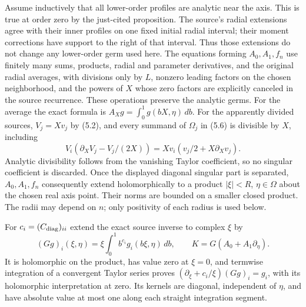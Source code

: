 Assume inductively that all lower-order profiles are analytic near
the axis. This is true at order zero by the just-cited proposition.
The source's radial extensions agree with their inner profiles on
one fixed initial radial interval; their moment corrections have
support to the right of that interval. Thus those extensions do not
change any lower-order germ used here. The equations forming
$A_0,A_1,f_n$ use finitely many sums, products, radial and parameter
derivatives, and the original radial averages, with divisions only
by $L$, nonzero leading factors on the chosen neighborhood, and
the powers of $X$ whose zero factors are explicitly canceled in
the source recurrence. These operations preserve the analytic
germs. For the average the exact formula is
$A_Xg=\int_0^1g(bX,\eta)\,db$. For the apparently divided sources,
$V_j=Xv_j$ by (5.2), and every summand of $\Omega_j$ in (5.6)
is divisible by $X$, including
\[
 V_i(\partial_XV_j-V_j/(2X))
       =Xv_i(v_j/2+X\partial_Xv_j).
\]
Analytic divisibility follows from the vanishing Taylor coefficient,
so no singular coefficient is discarded. Once the displayed
diagonal singular part is separated, $A_0,A_1,f_n$ consequently
extend holomorphically to a product
$|\xi|<R$, $\eta\in\Omega$ about the chosen real axis point.
Their norms are bounded on a smaller closed product. The radii
may depend on $n$; only positivity of each radius is used below.

For $c_i=(C_{\rm diag})_{ii}$ extend the exact source inverse
to complex $\xi$ by
\[
 (Gg)_i(\xi,\eta)=
       \xi\int_0^1b^{c_i}g_i(b\xi,\eta)\,db,\qquad
 K=G(A_0+A_1\partial_\eta).
\]
It is holomorphic on the product, has value zero at $\xi=0$,
and termwise integration of a convergent Taylor series proves
$(\partial_\xi+c_i/\xi)(Gg)_i=g_i$, with its holomorphic
interpretation at zero. Its kernels are diagonal, independent
of $\eta$, and have absolute value at most one along each
straight integration segment.

